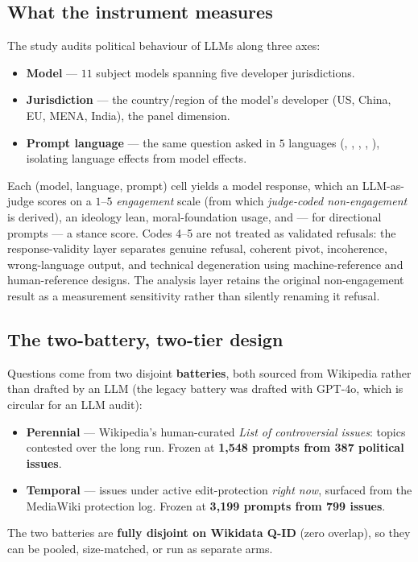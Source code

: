 \documentclass[11pt]{article}
\DeclareRobustCommand{\code}[1]{\texttt{\seqsplit{#1}}}
\begin{document}
\subsection{What the instrument measures}
The study audits political behaviour of LLMs along three axes:
\begin{itemize}[nosep]
  \item \textbf{Model} --- $11$ subject models spanning five developer
        jurisdictions.
  \item \textbf{Jurisdiction} --- the country/region of the model's developer
        (US, China, EU, MENA, India), the panel dimension.
  \item \textbf{Prompt language} --- the same question asked in $5$ languages
        (\code{en}, \code{zh}, \code{ar}, \code{ru}, \code{hi}), isolating
        language effects from model effects.
\end{itemize}
Each (model, language, prompt) cell yields a model response, which an
LLM-as-judge scores on a $1$--$5$ \emph{engagement} scale (from which
\emph{judge-coded non-engagement} is derived), an ideology lean,
moral-foundation usage, and --- for directional prompts --- a stance score.
Codes 4--5 are not treated as validated refusals: the response-validity layer
separates genuine refusal, coherent pivot, incoherence, wrong-language output,
and technical degeneration using machine-reference and human-reference designs.
The analysis layer retains the original non-engagement result as a measurement
sensitivity rather than silently renaming it refusal.

\subsection{The two-battery, two-tier design}
Questions come from two disjoint \textbf{batteries}, both sourced from Wikipedia
rather than drafted by an LLM (the legacy battery was drafted with GPT-4o, which
is circular for an LLM audit):
\begin{itemize}[nosep]
  \item \textbf{Perennial} --- Wikipedia's human-curated
        \emph{List of controversial issues}: topics contested over the long run.
        Frozen at \textbf{1{,}548 prompts from 387 political issues}.
  \item \textbf{Temporal} --- issues under active edit-protection \emph{right now},
        surfaced from the MediaWiki protection log. Frozen at \textbf{3{,}199
        prompts from 799 issues}.
\end{itemize}
The two batteries are \textbf{fully disjoint on Wikidata Q-ID} (zero overlap), so
they can be pooled, size-matched, or run as separate arms.
\end{document}
